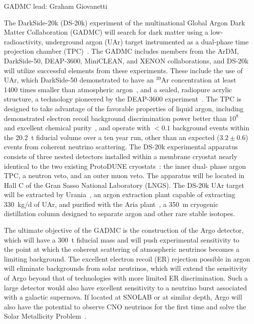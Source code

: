 GADMC lead: Graham Giovanetti

The DarkSide-20k (DS-20k) experiment of the multinational Global Argon Dark Matter Collaboration (GADMC) will search for dark matter using a low-radioactivity, underground argon (UAr) target instrumented as a dual-phase time projection chamber (TPC)~\cite{Aalseth:2018gq}. The GADMC includes members from the ArDM, DarkSide-50, DEAP-3600, MiniCLEAN, and XENON collaborations, and DS-20k will utilize successful elements from these experiments. These include the use of UAr, which DarkSide-50 demonstrated to have an $^{39}$Ar concentration at least 1400 times smaller than atmospheric argon~\cite{Agnes:2015gu,Agnes:2016fz,Agnes:2018ep}, and a sealed, radiopure acrylic structure, a technology pioneered by the DEAP-3600 experiment~\cite{Nantais:2013jp,Amaudruz:2018gr}. The TPC is designed to take advantage of the favorable properties of liquid argon, including demonstrated electron recoil background discrimination power better than $10^8$~\cite{Adhikari:2021} and excellent chemical purity~\cite{Ajaj:2019jx,Ajaj:2019jk}, and operate with $<0.1$ background events within the 20.2~t fiducial volume over a ten year run, other than an expected ($3.2 \pm 0.6$) events from coherent neutrino scattering. The DS-20k experimental apparatus consists of three nested detectors installed within a membrane cryostat nearly identical to the two existing ProtoDUNE cryostats~\cite{Abi:2020gv,Abi:2020hj,Abi:2020je}: the inner dual- phase argon TPC, a neutron veto, and an outer muon veto. The apparatus will be located in Hall C of the Gran Sasso National Laboratory (LNGS). The DS-20k UAr target will be extracted by Urania~\cite{Aalseth:2018gq}, an argon extraction plant capable of extracting 330~kg/d of UAr, and purified with the Aria plant~\cite{Agnes:2021us}, a 350~m cryogenic distillation column designed to separate argon and other rare stable isotopes.

The ultimate objective of the GADMC is the construction of the Argo detector, which will have a 300~t fiducial mass and will push experimental sensitivity to the point at which the coherent scattering of atmospheric neutrinos becomes a limiting background. The excellent electron recoil (ER) rejection possible in argon will eliminate backgrounds from solar neutrinos, which will extend the sensitivity of Argo beyond that of technologies with more limited ER discrimination. Such a large detector would also have excellent sensitivity to a neutrino burst associated with a galactic supernova. If located at SNOLAB or at similar depth, Argo will also have the potential to observe CNO neutrinos for the first time and solve the Solar Metallicity Problem~\cite{Agnes:2020wd,Franco:2016ex}.

